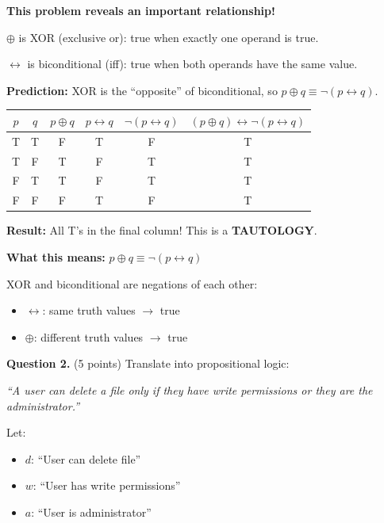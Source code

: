 \documentclass[11pt,a4paper]{article}
\begin{document}
\begin{solnbox}
\textbf{This problem reveals an important relationship!}

$\oplus$ is XOR (exclusive or): true when exactly one operand is true.

$\leftrightarrow$ is biconditional (iff): true when both operands have the same value.

\textbf{Prediction:} XOR is the ``opposite'' of biconditional, so $p \oplus q \equiv \neg(p \leftrightarrow q)$.

\begin{center}
\begin{tabular}{cc|cc|c|c}
\toprule
$p$ & $q$ & $p \oplus q$ & $p \leftrightarrow q$ & $\neg(p \leftrightarrow q)$ & $(p \oplus q) \leftrightarrow \neg(p \leftrightarrow q)$ \\
\midrule
T & T & F & T & F & T \\
T & F & T & F & T & T \\
F & T & T & F & T & T \\
F & F & F & T & F & T \\
\bottomrule
\end{tabular}
\end{center}

\textbf{Result:} All T's in the final column! This is a \textbf{TAUTOLOGY}.

\textbf{What this means:} $p \oplus q \equiv \neg(p \leftrightarrow q)$

XOR and biconditional are negations of each other:
\begin{itemize}[noitemsep]
    \item $\leftrightarrow$: same truth values $\to$ true
    \item $\oplus$: different truth values $\to$ true
\end{itemize}
\end{solnbox}

\vspace{15pt}

\textbf{Question 2.} (5 points) Translate into propositional logic:

\textit{``A user can delete a file only if they have write permissions or they are the administrator.''}

Let:
\begin{itemize}[noitemsep]
    \item $d$: ``User can delete file''
    \item $w$: ``User has write permissions''
    \item $a$: ``User is administrator''
\end{itemize}
\end{document}

